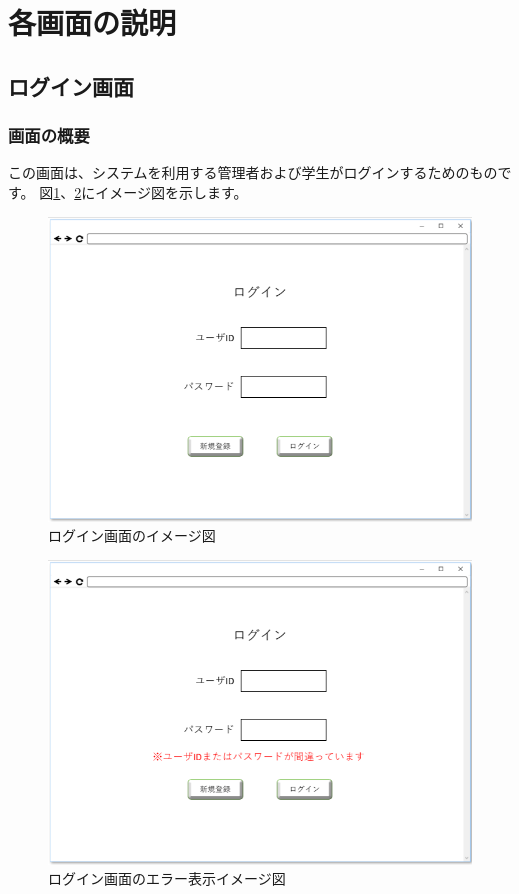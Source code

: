\section{各画面の説明}
\subsection{ログイン画面}
\subsubsection{画面の概要}
この画面は、システムを利用する管理者および学生がログインするためのものです。
図\ref{fig:01}、\ref{fig:02}にイメージ図を示します。

\begin{figure}[htbp]
  \begin{center}
    \includegraphics[width=1\linewidth,clip]{./img/01.png}
    \caption{ログイン画面のイメージ図}\label{fig:01}
  \end{center}
\end{figure}

\begin{figure}[htbp]
  \begin{center}
    \includegraphics[width=1\linewidth,clip]{./img/02.png}
    \caption{ログイン画面のエラー表示イメージ図}\label{fig:02}
  \end{center}
\end{figure}

